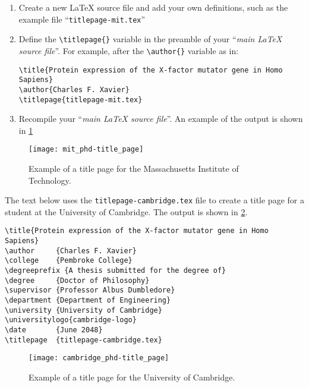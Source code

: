 \begin{enumerate}

    \item Create a new LaTeX source file and add your own definitions, such as the example file ``\verb|titlepage-mit.tex|''

    \item Define the \verb|\titlepage{}| variable in the preamble of your ``\textit{main LaTeX source file}''. For example, after the \verb|\author{}| variable as in:

\begin{lstlisting}[style=custom-latex]
\title{Protein expression of the X-factor mutator gene in Homo Sapiens}
\author{Charles F. Xavier}
\titlepage{titlepage-mit.tex}
\end{lstlisting}


    \item Recompile your ``\textit{main LaTeX source file}''. An example of the output is shown in \cref{fig:ch0:mit_phd-title_page}


\end{enumerate}



\begin{figure}[htb]
    \centering
    \texttt{[image: mit\_phd-title\_page]}
    \caption[Example of a title page for the Massachusetts Institute of Technology]
    {
        Example of a title page for the Massachusetts Institute of Technology.
        \label{fig:ch0:mit_phd-title_page}
    }
\end{figure}


The text below uses the \verb|titlepage-cambridge.tex| file to create a title page for a student at the University of Cambridge. The output is shown in \cref{fig:ch0:cambridge_phd-title_page}.

\begin{lstlisting}[style=custom-latex]
\title{Protein expression of the X-factor mutator gene in Homo Sapiens}
\author     {Charles F. Xavier}
\college    {Pembroke College}
\degreeprefix {A thesis submitted for the degree of}
\degree     {Doctor of Philosophy}
\supervisor {Professor Albus Dumbledore}
\department {Department of Engineering}
\university {University of Cambridge}
\universitylogo{cambridge-logo}
\date       {June 2048}
\titlepage  {titlepage-cambridge.tex}
\end{lstlisting}


\begin{figure}[htb]
    \centering
    \texttt{[image: cambridge\_phd-title\_page]}
    \caption[Example of a title page for the University of Cambridge]
    {
        Example of a title page for the University of Cambridge.
        \label{fig:ch0:cambridge_phd-title_page}
    }
\end{figure}



